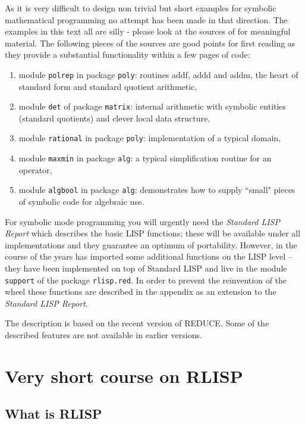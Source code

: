 As it is very difficult to design non trivial but short
examples for symbolic mathematical programming no
attempt has been made in that direction. The examples
in this text all are silly - please look at the
sources of {\reduce} for meaningful material. The following pieces
of the sources are good points for first reading as they
provide a substantial functionality within a few pages
of code:
\begin{enumerate}
\item module {\tt polrep} in package {\tt poly}: routines
   addf, addd and addm, the heart of standard form and
   standard quotient arithmetic,
\item module {\tt det} of package {\tt matrix}: internal
   arithmetic with symbolic entities (standard quotients)
   and clever local data structure,
\item module {\tt rational} in package {\tt poly}: implementation
   of a typical {\reduce} domain,
\item module {\tt maxmin} in package {\tt alg}: a typical
   simplification routine for an operator,
\item module {\tt algbool} in package {\tt alg}: demonstrates
   how to supply ``small" pieces of symbolic code for
   algebraic use.
\end{enumerate}

For symbolic mode programming you will urgently need the
{\em Standard LISP Report} which describes
the basic LISP functions; these will be available under all
{\reduce} implementations and they guarantee an optimum
of portability. However, in the course of the
years {\reduce} has imported some additional functions on the
LISP level -- they have been implemented on top of Standard LISP
and live in the module {\tt support} of 
the package {\tt rlisp.red}.
In order to prevent the reinvention of the wheel these functions
are described in the appendix as an extension to the
{\em Standard LISP Report}.

The description is based on the recent version of REDUCE. Some of the
described features are not available in earlier versions.
\section{Very short course on RLISP}

\subsection{What is RLISP}

